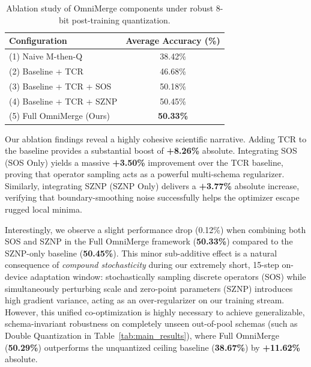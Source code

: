 \begin{table}[h]
\caption{Ablation study of OmniMerge components under robust 8-bit post-training quantization.}
\label{tab:ablation_study}
\vskip 0.15in
\begin{center}
\begin{small}
\begin{sc}
\begin{tabular}{lc}
\toprule
Configuration & Average Accuracy (\%) \\
\midrule
(1) Naive M-then-Q & 38.42\% \\
(2) Baseline + TCR & 46.68\% \\
(3) Baseline + TCR + SOS & 50.18\% \\
(4) Baseline + TCR + SZNP & 50.45\% \\
(5) Full OmniMerge (Ours) & \textbf{50.33\%} \\
\bottomrule
\end{tabular}
\end{sc}
\end{small}
\end{center}
\vskip -0.1in
\end{table}

Our ablation findings reveal a highly cohesive scientific narrative. Adding TCR to the baseline provides a substantial boost of \textbf{+8.26\%} absolute. Integrating SOS (SOS Only) yields a massive \textbf{+3.50\%} improvement over the TCR baseline, proving that operator sampling acts as a powerful multi-schema regularizer. Similarly, integrating SZNP (SZNP Only) delivers a \textbf{+3.77\%} absolute increase, verifying that boundary-smoothing noise successfully helps the optimizer escape rugged local minima. 

Interestingly, we observe a slight performance drop (0.12\%) when combining both SOS and SZNP in the Full OmniMerge framework (\textbf{50.33\%}) compared to the SZNP-only baseline (\textbf{50.45\%}). This minor sub-additive effect is a natural consequence of \emph{compound stochasticity} during our extremely short, 15-step on-device adaptation window: stochastically sampling discrete operators (SOS) while simultaneously perturbing scale and zero-point parameters (SZNP) introduces high gradient variance, acting as an over-regularizer on our training stream. However, this unified co-optimization is highly necessary to achieve generalizable, schema-invariant robustness on completely unseen out-of-pool schemas (such as Double Quantization in Table~\ref{tab:main_results}), where Full OmniMerge (\textbf{50.29\%}) outperforms the unquantized ceiling baseline (\textbf{38.67\%}) by \textbf{+11.62\%} absolute.

